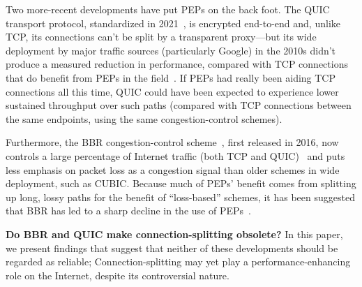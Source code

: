 Two more-recent developments have put PEPs on the back foot. The QUIC
transport protocol, standardized in 2021~\cite{rfc9000}, is encrypted
end-to-end and, unlike TCP, its connections can't be split by a
transparent proxy---but its wide deployment by major traffic sources (particularly Google)
in the 2010s didn't produce a measured reduction in performance,
compared with TCP connections that do benefit from PEPs in the
field~\cite{langley2017quic}. If PEPs had really been aiding TCP connections all this time,
QUIC could have been expected to experience lower sustained throughput
over such paths (compared with TCP connections between the same
endpoints, using the same congestion-control schemes).

Furthermore, the BBR congestion-control scheme~\cite{cardwell2017bbr}, first
released in 2016, now controls a large percentage of Internet traffic
(both TCP and QUIC)~\cite{ware2024ccanalyzer} and puts less emphasis on packet
loss as a congestion signal than older schemes in wide
deployment, such as CUBIC. Because much of PEPs' benefit comes from
splitting up long, lossy paths for the benefit of ``loss-based''
schemes, it has been suggested that BBR has led to
a sharp decline in the use of PEPs~\cite{frode}.

\textbf{Do BBR and QUIC make connection-splitting obsolete?} In this
paper, we present findings that suggest that neither of these
developments should be regarded as reliable;
Connection-splitting may yet play a performance-enhancing role
on the Internet, despite its controversial nature.



